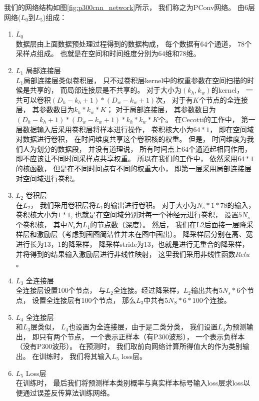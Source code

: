 我们的网络结构如图\ref{fig:p300cnn_network}所示， 我们称之为PConv网络。 由6层网络($L_0$到$L_5$)组成：


\begin{enumerate}
	\item $L_0$ \\
		数据层由上面数据预处理过程得到的数据构成， 每个数据有64个通道， 78个采样点组成。 也就是在空间和时间维度分别为64维和78维。 
	\item $L_1$ 局部连接层\\
		$L_1$局部连接层类似卷积层， 只不过卷积层kernel中的权重参数在空间扫描的时候是共享的， 而局部连接层是不共享的。 对于大小为$(k_h, k_w)$的kernel， 一共可以卷积$(D_h-k_h+1)*(D_w-k_w+1)$次， 对于有$K$个节点的全连接层， 其参数数目为$k_h*k_w*K$； 对于局部连接层， 其参数数目为$(D_h-k_h+1)*(D_w-k_w+1)*k_h*k_w*K$个。 在Cecotti的工作中\cite{cecotti2011convolutional}， 第一层数据输入后采用卷积层将样本进行操作， 卷积核大小为$64*1$， 即在空间域对数据进行卷积， 在时间维度共享这个卷积核的权重。 但是， 时间维度为我们人为划分的数据段， 并没有道理说， 所有时间点上64个通道起相同作用， 即不应该让不同时间采样点共享权重。 所以在我们的工作中， 依然采用$64*1$的核函数， 但是在不同时间点有不同的权重大小， 即第一层采用局部连接层对空间域进行卷积。	
		
	\item $L_2$ 卷积层\\
		在$L_2$， 我们采用卷积层将$L_1$的输出进行卷积。 对于大小为$N_s*1*78$的输入， 卷积核大小为$1*1$,  也就是在空间域分别对每一个神经元进行卷积， 设置$5N_s$个卷积核， 其中$N_s$为$L_1$的节点数（深度）。 然后， 我们在L2后面接一层降采样层和激励层（考虑到画图简洁性并未在图中画出）。 降采样层分别在高、宽进行长为13，1的降采样， 降采样stride为13，也就是进行无重合的降采样， 并将得到的结果输入激励层进行非线性映射， 这里我们采用非线性函数$Relu$。
	
	\item $L_3$ 全连接层\\
	全连接层设置100个节点， 与$L_2$全连接。经过降采样，$L_2$输出共有$5N_s*6$个节点， 设置全连接层有100个节点， 那么$L_3$中共有$5N_S*6*100$个连接。

	\item $L_4$ 全连接层\\
	和$L_3$层类似， $L_4$也设置为全连接层，由于是二类分类， 我们设置$L_4$为预测输出， 即只有两个节点， 一个表示正样本（有P300波形）， 一个表示负样本（没有P300波形）。 在预测时， 我们取前向网络计算所得值大的作为类别输出。 在训练时， 我们将其输入$L_5$ loss层。

	\item $L_5$ Loss层\\
	在训练时， 最后我们将预测样本类别概率与真实样本标号输入loss层求loss以便通过误差反传算法训练网络。

\end{enumerate}


